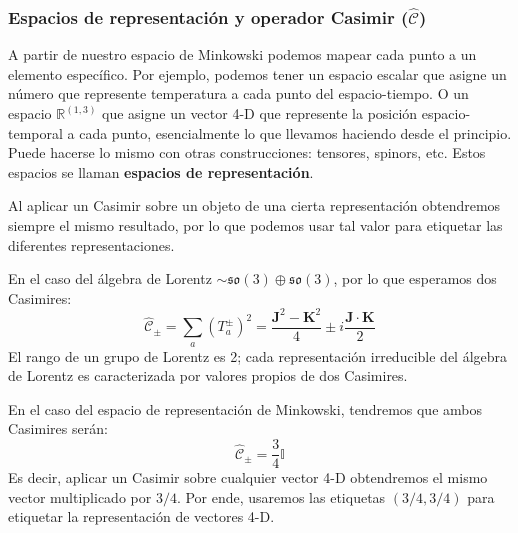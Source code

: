 \documentclass[]{article}
\numberwithin{equation}{section}
\begin{document}
\subsubsection{Espacios de representación y operador Casimir (\(\mathcal{\hat{C}}\))}
A partir de nuestro espacio de Minkowski podemos mapear cada punto a un elemento específico. Por ejemplo, podemos tener un espacio escalar que asigne un número que represente temperatura a cada punto del espacio-tiempo. O un espacio \(\mathbb{R}^{(1,3)}\) que asigne un vector 4-D que represente la posición espacio-temporal a cada punto, esencialmente lo que llevamos haciendo desde el principio. Puede hacerse lo mismo con otras construcciones: tensores, spinors, etc. Estos espacios se llaman \textbf{espacios de representación}.


Al aplicar un Casimir sobre un objeto de una cierta representación obtendremos siempre el mismo resultado, por lo que podemos usar tal valor para etiquetar las diferentes representaciones.

En el caso del álgebra de Lorentz  \(\sim\mathfrak{so}(3)\oplus\mathfrak{so}(3)\), por lo que esperamos dos Casimires:
\begin{equation}
	\mathcal{\hat{C}}_{\pm} = \sum_{a}(T_a^{\pm})^2 = \frac{\mathbf{J}^2-\mathbf{K}^2}{4} \pm i\frac{\mathbf{J}\cdot\mathbf{K}}{2}
\end{equation}
El rango de un grupo de Lorentz es 2; cada representación irreducible del álgebra de Lorentz es caracterizada por valores propios de dos Casimires.

En el caso del espacio de representación de Minkowski, tendremos que ambos Casimires serán:
\begin{equation}
	\mathcal{\hat{C}}_{\pm} = \frac{3}{4}\mathbb{I}
\end{equation}
Es decir, aplicar un Casimir sobre cualquier vector 4-D obtendremos el mismo vector multiplicado por \(3/4\). Por ende, usaremos las etiquetas \((3/4,3/4)\) para etiquetar la representación de vectores 4-D.
\end{document}
